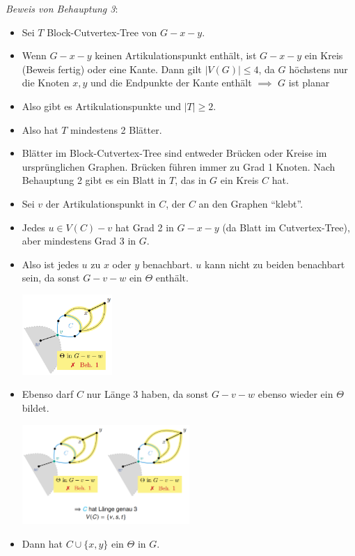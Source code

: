 \textit{Beweis von Behauptung 3}:
\begin{itemize}
	\item Sei $T$ Block-Cutvertex-Tree von $G-x-y$.
	\item Wenn $G-x-y$ keinen Artikulationspunkt enthält, ist $G-x-y$ ein Kreis (Beweis fertig)  oder eine Kante. Dann gilt $|V(G)|\leq 4$, da $G$ höchstens nur die Knoten $x,y$ und die Endpunkte der Kante enthält
	$\implies$ $G$ ist planar \Lightning
	\item Also gibt es Artikulationspunkte und $|T|\geq 2$.
	\item Also hat $T$ mindestens 2 Blätter.
	\item Blätter im Block-Cutvertex-Tree sind entweder Brücken oder Kreise im ursprünglichen Graphen. Brücken führen immer zu Grad 1 Knoten. Nach Behauptung 2 gibt es ein Blatt in $T$, das in $G$ ein Kreis $C$ hat.
	\item Sei $v$ der Artikulationspunkt in $C$, der $C$ an den Graphen \enquote{klebt}.
	\item Jedes $u\in V(C)-v$ hat Grad 2 in $G-x-y$ (da Blatt im Cutvertex-Tree), aber mindestens Grad 3 in $G$.
	\item Also ist jedes $u$ zu $x$ oder $y$ benachbart. $u$ kann nicht zu beiden benachbart sein, da sonst $G-v-w$ ein $\Theta$ enthält.
	\begin{center}
		\includegraphics[width=0.27\textwidth]{images/wagner-9.png}
	\end{center}
	\item Ebenso darf $C$ nur Länge 3 haben, da sonst $G-v-w$ ebenso wieder ein $\Theta$ bildet.
	\begin{center}
		\includegraphics[width=0.5\textwidth]{images/wagner-10.png}
	\end{center}
	\item Dann hat $C\cup\{x,y\}$ ein $\Theta$ in $G$.

\end{itemize}
